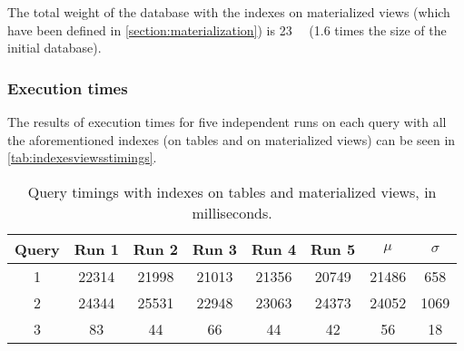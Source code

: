 The total weight of the database with the indexes on materialized views (which have been defined in \autoref{section:materialization}) is \SI{23}{\giga\byte} (\num{1.6} times the size of the initial database).

\subsubsection{Execution times}

The results of execution times for five independent runs on each query with all the aforementioned indexes (on tables and on materialized views) can be seen in \autoref{tab:indexesviewsstimings}.

\begin{table}[!h]
\centering
\begin{tabular}{|| c | c c c c c | c c ||} 
 \hline
 Query & Run 1 & Run 2 & Run 3 & Run 4 & Run 5 & 	$\mu$ & $\sigma$ \\ [0.5ex] 
 \hline\hline
 1 & 22314 & 21998 & 21013 & 21356 & 20749 & 21486 & 658 \\ 
 \hline
 2 & 24344 & 25531 & 22948 & 23063 & 24373 & 24052 & 1069 \\
 \hline
 3 & 83 & 44 & 66 & 44 & 42 & 56 & 18 \\
 \hline
\end{tabular}
  \caption{Query timings with indexes on tables and materialized views, in milliseconds.}
  \label{tab:indexesviewsstimings}
\end{table}


